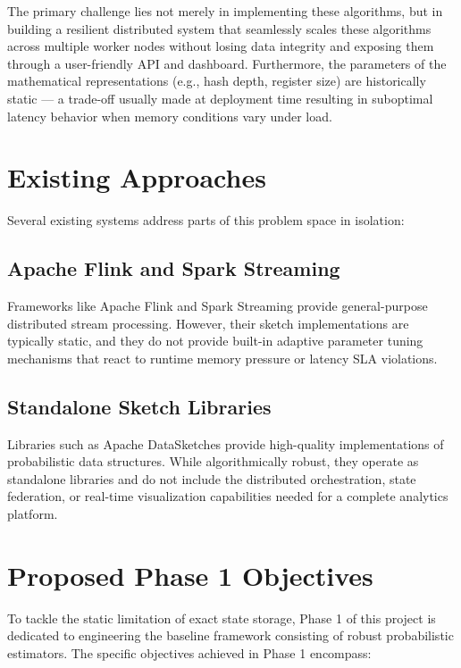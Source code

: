 The primary challenge lies not merely in implementing these algorithms, but in building a resilient distributed system that seamlessly scales these algorithms across multiple worker nodes without losing data integrity and exposing them through a user-friendly API and dashboard. Furthermore, the parameters of the mathematical representations (e.g., hash depth, register size) are historically static --- a trade-off usually made at deployment time resulting in suboptimal latency behavior when memory conditions vary under load.

\section{Existing Approaches}

Several existing systems address parts of this problem space in isolation:

\subsection{Apache Flink and Spark Streaming}
Frameworks like Apache Flink and Spark Streaming provide general-purpose distributed stream processing. However, their sketch implementations are typically static, and they do not provide built-in adaptive parameter tuning mechanisms that react to runtime memory pressure or latency SLA violations.

\subsection{Standalone Sketch Libraries}
Libraries such as Apache DataSketches provide high-quality implementations of probabilistic data structures. While algorithmically robust, they operate as standalone libraries and do not include the distributed orchestration, state federation, or real-time visualization capabilities needed for a complete analytics platform.

\section{Proposed Phase 1 Objectives}

To tackle the static limitation of exact state storage, Phase 1 of this project is dedicated to engineering the baseline framework consisting of robust probabilistic estimators. The specific objectives achieved in Phase 1 encompass:

